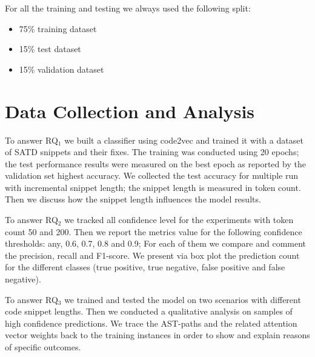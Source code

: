 For all the training and testing we always used the following split:  
\begin{itemize}
    \item 75\% training dataset
    \item 15\% test dataset
    \item 15\% validation dataset
\end{itemize}

\section{Data Collection and Analysis}



To answer RQ$_1$ we built a classifier using code2vec and trained it with a dataset of SATD snippets and their fixes.
The training was conducted using 20 epochs; the test performance results were measured on the best epoch as reported by the validation set highest accuracy.
We collected the test accuracy for multiple run with incremental snippet length; the snippet length is measured in token count. Then we discuss how the snippet length influences the model results.

To answer RQ$_2$ we tracked all confidence level for the experiments with token count 50 and 200. Then we report the metrics value for the following confidence thresholds: any, 0.6, 0.7, 0.8 and 0.9; For each of them we compare and comment the precision, recall and F1-score. We present via box plot the prediction count for the different classes (true positive, true negative, false positive and false negative). 

To answer RQ$_3$ we trained and tested the model on two scenarios with different code snippet lengths. Then we conducted a qualitative analysis on samples of high confidence predictions. We trace the AST-paths and the related attention vector weights back to the training instances in order to show and explain reasons of specific outcomes.



